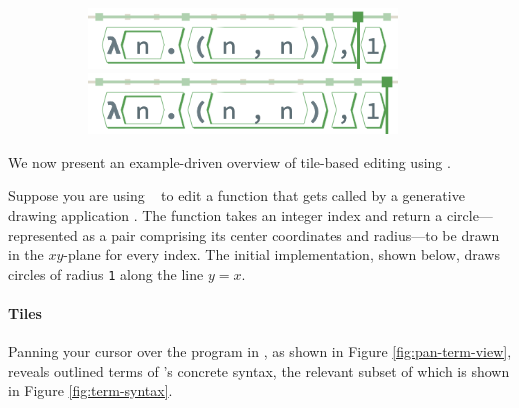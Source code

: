 \begin{figure}
\begin{subfigure}[c]{0.25\textwidth}
    \includegraphics[width=0.9\textwidth]{img/pan-tiles-9.png}
    \includegraphics[width=0.9\textwidth]{img/pan-tiles-10.png}
    \caption{}
    \label{fig:pan-tile-view}
  \end{subfigure}
\end{figure}

% 
% 

We now present an example-driven overview of tile-based
editing using \tylr.





Suppose you are using \tylr~ to edit a function that gets called by a
generative drawing application .
The function takes an integer index and
return a circle---represented as a pair comprising
its center coordinates and radius---to be drawn in
the $xy$-plane for every index.
The initial implementation, shown below, draws circles
of radius \texttt{1} along the line $y = x$.

\paragraph{Tiles}
Panning your cursor over the program in \tylr ,
as shown in Figure \ref{fig:pan-term-view},
reveals outlined terms of \tylr's concrete syntax,
the relevant subset of which is shown in
Figure \ref{fig:term-syntax}.

